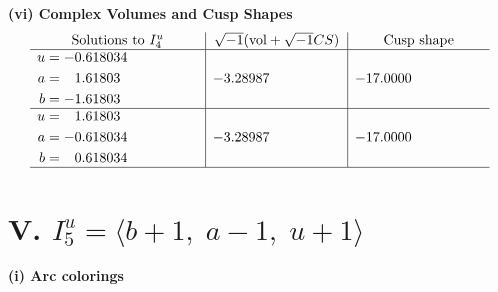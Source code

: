 \documentclass[1p]{elsarticle_modified}
\theoremstyle{definition}
\newcommand{\I}{\sqrt{-1}}
\begin{document}
\newpage\flushleft \textbf{(vi) Complex Volumes and Cusp Shapes}
$$\begin{array}{c|c|c}  
\text{Solutions to }I^u_{4}& \I (\text{vol} + \sqrt{-1}CS) & \text{Cusp shape}\\
 \hline 
\begin{aligned}
u &= -0.618034\phantom{ +0.000000I} \\
a &= \phantom{-}1.61803\phantom{ +0.000000I} \\
b &= -1.61803\phantom{ +0.000000I}\end{aligned}
 & -3.28987\phantom{ +0.000000I} & -17.0000\phantom{ +0.000000I} \\ \hline\begin{aligned}
u &= \phantom{-}1.61803\phantom{ +0.000000I} \\
a &= -0.618034\phantom{ +0.000000I} \\
b &= \phantom{-}0.618034\phantom{ +0.000000I}\end{aligned}
 & -3.28987\phantom{ +0.000000I} & -17.0000\phantom{ +0.000000I}\\
 \hline 
 \end{array}$$\newpage\newpage\renewcommand{\arraystretch}{1}
\centering \section*{V. $I^u_{5}= \langle b+1,\;a-1,\;u+1 \rangle$}
\flushleft \textbf{(i) Arc colorings}\\
\end{document}
